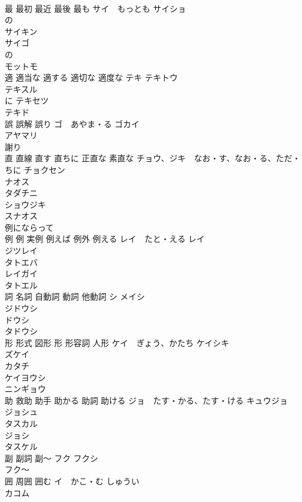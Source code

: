 \documentclass[8pt]{extreport}
\begin{document}
\begin{CJK}{UTF8}{min}
\\	最 最初 最近 最後 最も	サイ　もっとも サイショ 
\\	の
\\	サイキン 
\\	サイゴ　
\\	の
\\	モットモ 
\\	適 適当な 適する 適切な 適度な	テキ テキトウ 
\\	テキスル 
\\	に テキセツ 
\\	テキド 
\\	誤 誤解 誤り	ゴ　あやま・る ゴカイ 
\\	アヤマリ 
\\	謝り 
\\	直 直線 直す 直ちに 正直な 素直な	チョウ、ジキ　なお・す、なお・る、ただ・ちに チョクセン 
\\	ナオス 
\\	タダチニ 
\\	ショウジキ 
\\	スナオス 
\\	例にならって	
\\	例 例 実例 例えば 例外 例える	レイ　たと・える レイ 
\\	ジツレイ 
\\	タトエバ 
\\	レイガイ
\\	タトエル 
\\	詞 名詞 自動詞 動詞 他動詞	シ メイシ 
\\	ジドウシ 
\\	ドウシ 
\\	タドウシ 
\\	形 形式 図形 形 形容詞 人形	ケイ　ぎょう、かたち ケイシキ 
\\	ズケイ 
\\	カタチ 
\\	ケイヨウシ 
\\	ニンギョウ 
\\	助 救助 助手 助かる 助詞 助ける	ジョ　たす・かる、たす・ける キュウジョ 
\\	ジョシュ 
\\	タスカル 
\\	ジョシ 
\\	タスケル
\\	副 副詞 副〜	フク フクシ 
\\	フク〜　
\\	囲 周囲 囲む	イ　かこ・む しゅうい 
\\	カコム 

\end{CJK}
\end{document}
